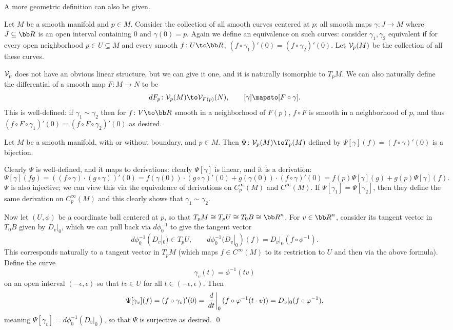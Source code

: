 A more geometric definition can also be given.

\bdefn

    Let $M$ be a smooth manifold and $p\in M$.
    Consider the collection of all smooth curves centered at $p$: all smooth maps $\gamma\colon J\to M$ where $J\subseteq\bR$ is an open interval
    containing $0$ and $\gamma(0)=p$.
    Again we define an equivalence on such curves: consider $\gamma_1,\gamma_2$ equivalent if for every open neighborhood $p\in U\subseteq M$ and every
    smooth $f\colon U\to\bR$, $(f\circ\gamma_1)'(0)=(f\circ\gamma_2)'(0)$.
    Let ${{\cal V}}_p(M)$ be the collection of all these curves.

\edefn

${{\cal V}}_p$ does not have an obvious linear structure, but we can give it one, and it is naturally isomorphic to $T_pM$.
We can also naturally define the differential of a smooth map $F\colon M\to N$ to be
$$ dF_p\colon\V_p(M)\to\V_{F(p)}(N),\qquad [\gamma]\mapsto[F\circ\gamma] . $$
This is well-defined: if $\gamma_1\sim\gamma_2$ then for $f\colon V\to\bR$ smooth in a neighborhood of $F(p)$, $f\circ F$ is smooth in a neighborhood
of $p$, and thus $(f\circ F\circ\gamma_1)'(0)=(f\circ F\circ\gamma_2)'(0)$ as desired.

\bprop

    Let $M$ be a smooth manifold, with or without boundary, and $p\in M$.
    Then $\Psi\colon\V_p(M)\to T_p(M)$ defined by $\Psi[\gamma](f)=(f\circ\gamma)'(0)$ is a bijection.

\eprop

\bproof

    Clearly $\Psi$ is well-defined, and it maps to derivations: clearly $\Psi[\gamma]$ is linear, and it is a derivation:
    $$ \Psi[\gamma](fg) = ((f\circ\gamma)\cdot(g\circ\gamma))'(0) = f(\gamma(0))\cdot(g\circ\gamma)'(0) + g(\gamma(0))\cdot(f\circ\gamma)'(0) =
    f(p)\Psi[\gamma](g) + g(p)\Psi[\gamma](f) . $$
    $\Psi$ is also injective; we can view this via the equivalence of derivations on $C^\infty_p(M)$ and $C^\infty(M)$.
    If $\Psi[\gamma_1]=\Psi[\gamma_2]$, then they define the same derivation on $C^\infty_p(M)$ and this clearly shows that $\gamma_1\sim\gamma_2$.

    Now let $(U,\phi)$ be a coordinate ball centered at $p$, so that $T_pM\cong T_pU\cong T_0B\cong\bR^n$.
    For $v\in\bR^n$, consider its tangent vector in $T_0B$ given by $D_v|_0$, which we can pull back via $d\phi^{-1}_0$ to give the tangent vector
    $$ d\phi^{-1}_0(D_v|_0) \in T_pU,\qquad d\phi^{-1}_0(D_v|_0)(f) = D_v|_0(f\circ\phi^{-1}) . $$
    This corresponds naturally to a tangent vector in $T_pM$ (which maps $f\in C^\infty(M)$ to its restriction to $U$ and then via the above formula).
    Define the curve
    $$ \gamma_v(t) = \phi^{-1}(tv) $$
    on an open interval $(-\epsilon,\epsilon)$ so that $tv\in U$ for all $t\in(-\epsilon,\epsilon)$.
    Then
    $$ \Psi[\gamma_v](f) = (f\circ\gamma_v)'(0) = \left.{{d}\over{dt}}\right|_0(f\circ\varphi^{-1}(t\cdot v)) = D_v|_0(f\circ\varphi^{-1}) , $$
    meaning $\Psi[\gamma_v]=d\phi^{-1}_0(D_v|_0)$, so that $\Psi$ is surjective as desired.
    \qed

